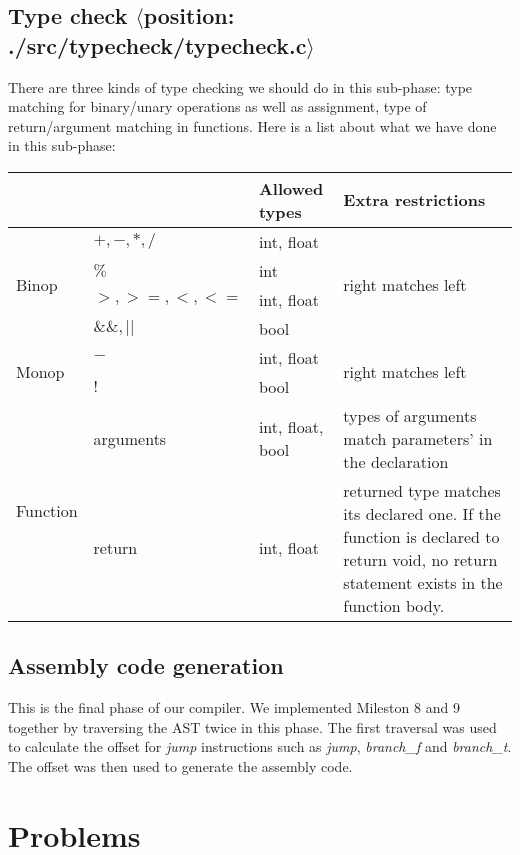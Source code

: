 \documentclass[a4paper,11pt]{article}
\begin{document}
\subsection{Type check $\langle$position: ./src/typecheck/typecheck.c$\rangle$}
There are three kinds of type checking we should do in this sub-phase: type matching for binary/unary operations as well as assignment, type of return/argument matching in functions. Here is a list about what we have done in this sub-phase:
\begin{center}
\begin{tabular}{|l|l|l|p{5cm}|}
\hline
    &   & Allowed types & Extra restrictions \\ \hline
\multirow{4}{*}{Binop} 
    & $+, -, *, /$ & int, float &  \multirow{4}{*}{right matches left}\\ \cline{2-3}
    & $\%$ & int & \\ \cline{2-3}
    & $>, >=, <, <=$ & int, float & \\\cline{2-3}
    & $\&\&, ||$ & bool & \\ \hline
\multirow{2}{*}{Monop}
    & $-$ & int, float & \multirow{2}{*}{right matches left} \\\cline{2-3}
    & $!$ & bool & \\ \hline
\multirow{2}{*}{Function}
    & arguments & int, float, bool & types of arguments match parameters' in the declaration \\ \cline{2-4}
    & return & int, float & returned type matches its declared one. If the function is declared to return void, no return statement exists in the function body. \\ \hline
\end{tabular}
\end{center}

\subsection{Assembly code generation}
This is the final phase of our compiler. We implemented Mileston 8 and 9 together by traversing the AST twice in this phase. The first traversal was used to calculate the offset for \emph{jump} instructions such as \emph{jump}, \emph{branch\_f} and \emph{branch\_t}. The offset was then used to generate the assembly code.

\section{Problems}
\end{document}
